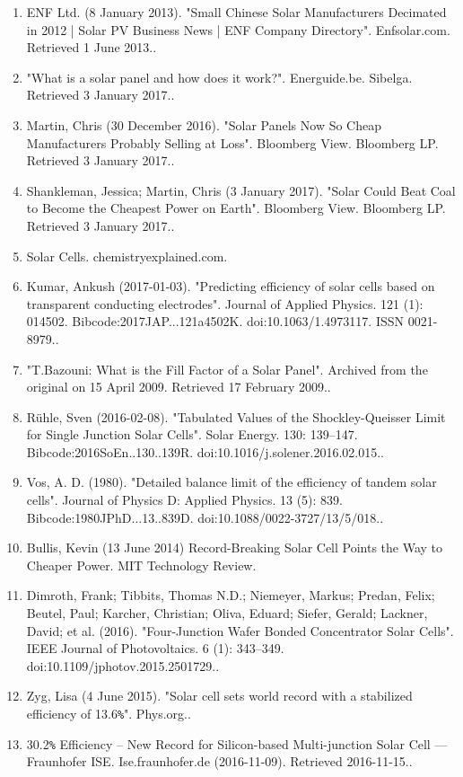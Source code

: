 \begin{enumerate}
\item ENF Ltd. (8 January 2013). "Small Chinese Solar Manufacturers Decimated in 2012 | Solar PV Business News | ENF Company Directory". Enfsolar.com. Retrieved 1 June 2013..
\item "What is a solar panel and how does it work?". Energuide.be. Sibelga. Retrieved 3 January 2017..
\item Martin, Chris (30 December 2016). "Solar Panels Now So Cheap Manufacturers Probably Selling at Loss". Bloomberg View. Bloomberg LP. Retrieved 3 January 2017..
\item Shankleman, Jessica; Martin, Chris (3 January 2017). "Solar Could Beat Coal to Become the Cheapest Power on Earth". Bloomberg View. Bloomberg LP. Retrieved 3 January 2017..
\item Solar Cells. chemistryexplained.com.
\item  Kumar, Ankush (2017-01-03). "Predicting efficiency of solar cells based on transparent conducting electrodes". Journal of Applied Physics. 121 (1): 014502. Bibcode:2017JAP...121a4502K. doi:10.1063/1.4973117. ISSN 0021-8979..
\item "T.Bazouni: What is the Fill Factor of a Solar Panel". Archived from the original on 15 April 2009. Retrieved 17 February 2009..
\item Rühle, Sven (2016-02-08). "Tabulated Values of the Shockley-Queisser Limit for Single Junction Solar Cells". Solar Energy. 130: 139–147. Bibcode:2016SoEn..130..139R. doi:10.1016/j.solener.2016.02.015..
\item Vos, A. D. (1980). "Detailed balance limit of the efficiency of tandem solar cells". Journal of Physics D: Applied Physics. 13 (5): 839. Bibcode:1980JPhD...13..839D. doi:10.1088/0022-3727/13/5/018..
\item Bullis, Kevin (13 June 2014) Record-Breaking Solar Cell Points the Way to Cheaper Power. MIT Technology Review.
\item Dimroth, Frank; Tibbits, Thomas N.D.; Niemeyer, Markus; Predan, Felix; Beutel, Paul; Karcher, Christian; Oliva, Eduard; Siefer, Gerald; Lackner, David; et al. (2016). "Four-Junction Wafer Bonded Concentrator Solar Cells". IEEE Journal of Photovoltaics. 6 (1): 343–349. doi:10.1109/jphotov.2015.2501729..
\item Zyg, Lisa (4 June 2015). "Solar cell sets world record with a stabilized efficiency of 13.6\verb|%|". Phys.org..
\item 30.2\verb|%| Efficiency – New Record for Silicon-based Multi-junction Solar Cell — Fraunhofer ISE. Ise.fraunhofer.de (2016-11-09). Retrieved 2016-11-15..

\end{enumerate}
